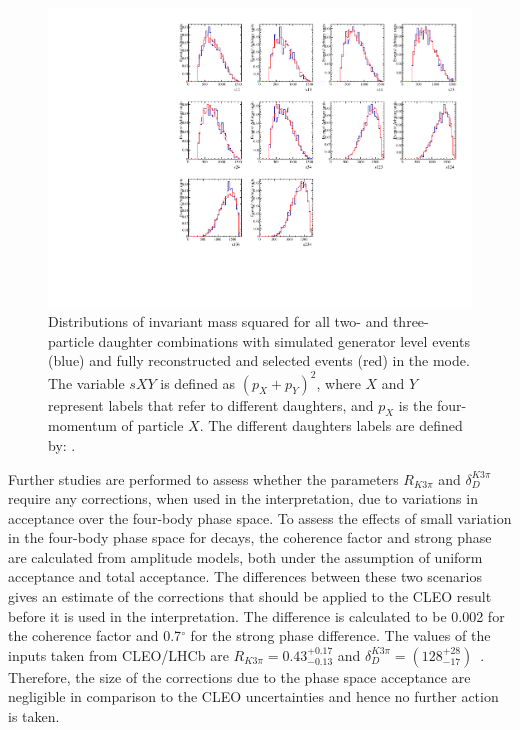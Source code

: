 \begin{figure}[h]
\centering
\includegraphics[width=0.9\linewidth]{figures/results/dalitzDist_PiPiPiPi.pdf}
\caption{Distributions of invariant mass squared for all two- and three-particle \Dz daughter combinations with simulated generator level events (blue) and fully reconstructed and selected events (red) in the \pipipipi mode. The variable $sXY$ is defined as $(p_X + p_Y)^2$, where $X$ and $Y$ represent labels that refer to different \Dz daughters, and $p_X$ is the four-momentum of particle $X$. The different \Dz daughters labels are defined by: .}
\label{dalitz4pi}
\end{figure}

Further studies are performed to assess whether the parameters $R_{K3\pi}$ and $\delta_D^{K3\pi}$ require any corrections, when used in the interpretation, due to variations in acceptance over the four-body phase space. To assess the effects of small variation in the four-body phase space for \kpipipi decays, the coherence factor and strong phase are calculated from \kpipipi amplitude models, both under the assumption of uniform acceptance and total \lhcb acceptance. The differences between these two scenarios gives an estimate of the corrections that should be applied to the CLEO result before it is used in the \lhcb interpretation. The difference is calculated to be 0.002 for the coherence factor and 0.7$^{\circ}$ for the strong phase difference. The values of the inputs taken from CLEO/LHCb are $R_{K3\pi} = 0.43^{+0.17}_{-0.13}$ and $\delta_D^{K3\pi} = \left(128^{+28}_{-17}\right)$~\cite{charmk3pi}. Therefore, the size of the corrections due to the \lhcb phase space acceptance are negligible in comparison to the CLEO uncertainties and hence no further action is taken.


